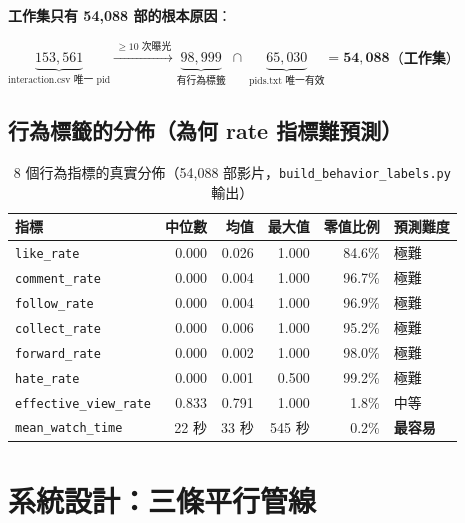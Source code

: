 \documentclass[12pt, a4paper]{article}
\begin{document}
\textbf{工作集只有 54,088 部的根本原因}：

\vspace{6pt}
$\underbrace{153{,}561}_{\text{interaction.csv 唯一 pid}}
\xrightarrow{\,\geq10\text{ 次曝光}\,}
\underbrace{98{,}999}_{\text{有行為標籤}}
\;\cap\;
\underbrace{65{,}030}_{\text{pids.txt 唯一有效}}
= \mathbf{54{,}088}$（\textbf{工作集}）

\subsection{行為標籤的分佈（為何 rate 指標難預測）}

\begin{table}[H]
\centering
\caption{8 個行為指標的真實分佈（54,088 部影片，\texttt{build\_behavior\_labels.py} 輸出）}
\label{tab:label_stats}
\begin{tabular}{lrrrrl}
\toprule
\textbf{指標} & \textbf{中位數} & \textbf{均值} & \textbf{最大值} & \textbf{零值比例} & \textbf{預測難度} \\
\midrule
\texttt{like\_rate}            & 0.000 & 0.026 & 1.000 & 84.6\% & 極難 \\
\texttt{comment\_rate}         & 0.000 & 0.004 & 1.000 & 96.7\% & 極難 \\
\texttt{follow\_rate}          & 0.000 & 0.004 & 1.000 & 96.9\% & 極難 \\
\texttt{collect\_rate}         & 0.000 & 0.006 & 1.000 & 95.2\% & 極難 \\
\texttt{forward\_rate}         & 0.000 & 0.002 & 1.000 & 98.0\% & 極難 \\
\texttt{hate\_rate}            & 0.000 & 0.001 & 0.500 & 99.2\% & 極難 \\
\texttt{effective\_view\_rate} & 0.833 & 0.791 & 1.000 &  1.8\% & 中等 \\
\texttt{mean\_watch\_time}     & 22 秒 & 33 秒 & 545 秒 &  0.2\% & \textbf{最容易} \\
\bottomrule
\end{tabular}
\end{table}

\section{系統設計：三條平行管線}
\label{sec:system}
\end{document}
